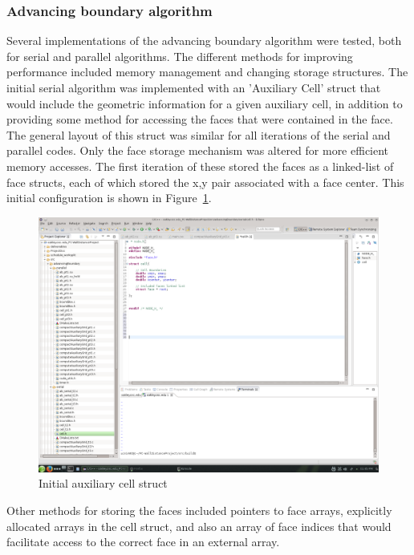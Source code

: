 \documentclass[]{aiaa-tc}%
\begin{document}
\subsubsection{Advancing boundary algorithm}
Several implementations of the advancing boundary algorithm were
tested, both for serial and parallel algorithms. The different methods
for improving performance included memory management and changing storage
structures. The initial serial algorithm was implemented with an
'Auxiliary Cell' struct that would include the geometric information
for a given auxiliary cell, in addition to providing some method for
accessing the faces that were contained in the face. The general
layout of this struct was similar for all iterations of the serial and
parallel codes. Only the face storage mechanism was altered for more
efficient memory accesses. The first iteration of these stored the
faces as a linked-list of face structs, each of which stored the x,y
pair associated with a face center. This initial configuration is shown in
Figure~\ref{f:initial_aux_cell}.

\begin{figure}
  \centering
  \includegraphics[trim=11.2cm 21.8cm 24cm 5.2cm,
  clip=true, width=0.3\linewidth]{figures/cells/cell_linked_list}
  \caption{Initial auxiliary cell struct}
  \label{f:initial_aux_cell}
\end{figure}

Other methods for storing the faces included pointers to face arrays,
explicitly allocated arrays in the cell struct, and also an array of
face indices that would facilitate access to the correct face in an
external array.
\end{document}
